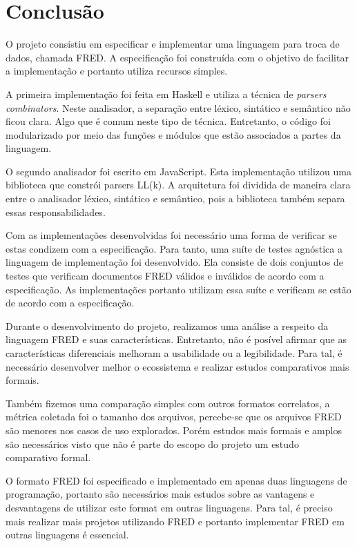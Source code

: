 \chapter[Conclusão]{Conclusão}

O projeto consistiu em especificar e implementar uma linguagem para troca de dados, chamada FRED.
A especificação foi construída com o objetivo de facilitar a implementação e portanto
utiliza recursos simples.

A primeira implementação foi feita em Haskell e utiliza a técnica
de \textit{parsers combinators}. Neste analisador, a separação entre léxico, sintático
e semântico não ficou clara. Algo que é comum neste tipo de técnica. 
Entretanto, o código foi modularizado por meio 
das funções e módulos que estão associados a partes da linguagem.

O segundo analisador foi escrito em JavaScript. Esta implementação
utilizou uma biblioteca que constrói parsers LL(k). A arquitetura foi dividida 
de maneira clara entre o analisador léxico, sintático e semântico, pois
a biblioteca também separa essas responsabilidades.

Com as implementações desenvolvidas foi necessário uma forma de verificar se estas
condizem com a especificação. Para tanto, uma suíte de testes agnóstica a linguagem
de implementação foi desenvolvido. Ela consiste de dois conjuntos de testes
que verificam documentos FRED válidos e inválidos de acordo com a especificação.
As implementações portanto utilizam essa suíte e verificam se estão de 
acordo com a especificação.

Durante o desenvolvimento do projeto, realizamos uma análise a 
respeito da linguagem FRED e suas características. Entretanto,
não é posível afirmar que as características diferenciais melhoram
a usabilidade ou a legibilidade. Para tal, é necessário desenvolver melhor o
ecossistema e realizar estudos comparativos mais formais.

Também fizemos uma comparação simples com outros formatos correlatos, 
a métrica coletada foi o tamanho dos arquivos, percebe-se que os 
arquivos FRED são menores nos casos de uso explorados. Porém estudos mais
formais e amplos são necessários visto que não é parte do escopo do projeto
um estudo comparativo formal.

O formato FRED foi especificado e implementado em apenas duas linguagens de programação,
portanto são necessários mais estudos sobre as vantagens e desvantagens
de utilizar este format em outras linguagens. Para tal, é preciso mais realizar mais projetos 
utilizando FRED e portanto implementar FRED em outras linguagens é essencial.

